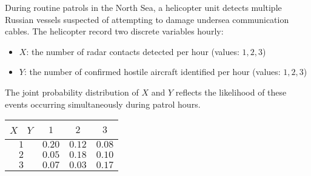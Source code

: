 \begin{enquestion}{17}{
    During routine patrols in the North Sea, a helicopter unit detects multiple Russian vessels suspected of attempting to damage undersea communication cables.
    The helicopter record two discrete variables hourly:
    \begin{itemize}
        \item $X$: the number of radar contacts detected per hour (values: $1, 2, 3$)
        \item $Y$: the number of confirmed hostile aircraft identified per hour (values: $1, 2, 3$)
    \end{itemize}
    The joint probability distribution of $X$ and $Y$ reflects the likelihood of these events occurring simultaneously during patrol hours.
    \begin{center}
        \begin{tabular}{c|ccc}
            \toprule
                {$X$ \ $Y$} &  $1$ & $2$ & $3$ \\
            \midrule 
                $1$ & $0.20$ & $0.12$ & $0.08$ \\
                $2$ & $0.05$ & $0.18$ & $0.10$ \\
                $3$ & $0.07$ & $0.03$ & $0.17$ \\
            \bottomrule
        \end{tabular}
    \end{center}
}

\end{enquestion}
